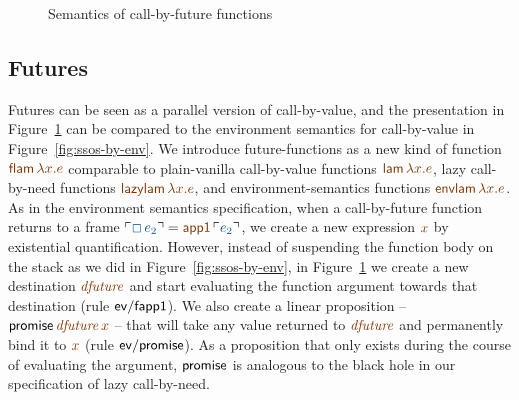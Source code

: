 \begin{figure}
\caption{Semantics of call-by-future functions}
\label{fig:dest-futures}
\end{figure}

\subsection{Futures}
\label{sec:dest-futures}

Futures can be seen as a parallel version of call-by-value, and the
presentation in Figure~\ref{fig:dest-futures} can be compared to the
environment semantics for call-by-value in
Figure~\ref{fig:ssos-by-env}. We introduce future-functions as a new
kind of function $\lf{{\sf flam}\,\lambda x.e}$ comparable to plain-vanilla
call-by-value functions $\lf{{\sf lam}\,\lambda x.e}$, lazy call-by-need
functions $\lf{{\sf lazylam}\,\lambda x.e}$, and environment-semantics
functions $\lf{{\sf envlam}\,\lambda x.e}$. As in the environment semantics
specification, when a call-by-future function returns to a frame
$\interp{\Box\,e_2} = \lf{{\sf app1}\,\interp{e_2}}$,
 we create a new expression $\lf{x}$
by existential quantification. However, instead of suspending the
function body on the stack as we did in Figure~\ref{fig:ssos-by-env},
in Figure~\ref{fig:dest-futures} we create a new destination $\lf{\it
  dfuture}$ and start evaluating the function argument towards that
destination (rule ${\sf ev/fapp1}$). We also create a linear
proposition -- ${\sf promise}\,\lf{\it dfuture}\,\lf{x}$ -- that will take
any value returned to $\lf{\it dfuture}$ and permanently bind it to $\lf{x}$
(rule ${\sf ev/promise}$). As a proposition that only exists during
the course of evaluating the argument, ${\sf promise}$ is analogous to
the black hole in our specification of lazy call-by-need.

